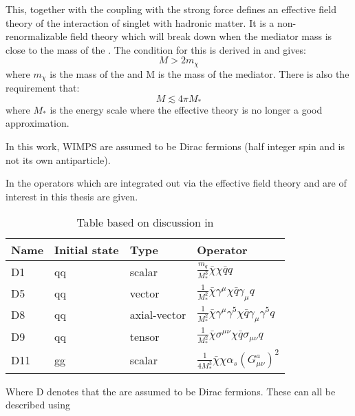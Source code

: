 This, together with the coupling with the strong force defines an effective field theory of the interaction of singlet \abbrWIMPS with hadronic matter. It is a non-renormalizable field theory which will break down when the mediator mass is close to the mass of the \abbrWIMP .
The condition for this is derived in \citep{82.116010} and gives:
\begin{equation}
M > 2 m_\chi
\end{equation}
where $m_\chi$ is the mass of the \abbrWIMP and M is the mass of the mediator. There is also the requirement that:
\begin{equation}
M \lesssim 4 \pi M_*
\end{equation}
where $M_*$ is the energy scale where the effective theory is no longer a good approximation.

In this work, WIMPS are assumed to be Dirac fermions (half integer spin and is not its own antiparticle). 
 
In  the operators which are integrated out via the effective field theory and are of interest in this thesis are given.
\renewcommand{\arraystretch}{1.5} %
\begin{table}[H]
\begin{center}
    \begin{tabular}{ | l | l | l | l |}
    \hline
    Name & Initial state & Type & Operator \\ \hline
  	D1 & qq & scalar & $\frac{m_q}{M^3_*} \bar{\chi} \chi \bar{q} q$ \\ \hline
  	D5 & qq & vector & $\frac{1}{M^2_*} \bar{\chi} \gamma^\mu \chi \bar{q} \gamma_\mu q$ \\ \hline
  	D8 & qq & axial-vector & $\frac{1}{M^2_*}\bar{\chi}\gamma^\mu \gamma^5 \chi \bar{q} \gamma_\mu \gamma^5 q $ \\ \hline
  	D9 & qq & tensor & $\frac{1}{M^2_*} \bar{\chi}\sigma^{\mu \nu} \chi \bar{q} \sigma_{\mu \nu} q  $\\ \hline
  	D11 & gg & scalar & $\frac{1}{4M^3_*}\bar{\chi}\chi \alpha_s (G^a_{\mu \nu})^2 $\\ \hline
  	\end{tabular}

  	\caption{Table based on discussion in \citep{CERN-PH-EP-2012-210}}
  	\label{tab:operators}
  	  	\end{center}
    \end{table}
\renewcommand{\arraystretch}{1.0}  %
Where D denotes that the \abbrWIMPS are assumed to be Dirac fermions. These can all be described using 

